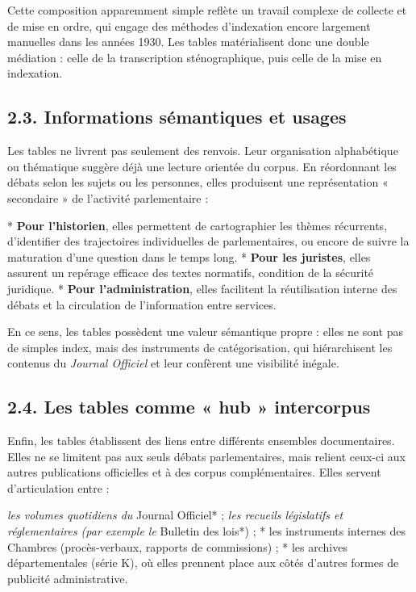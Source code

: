 Cette composition apparemment simple reflète un travail complexe de collecte et de mise en ordre, qui engage des méthodes d’indexation encore largement manuelles dans les années 1930. Les tables matérialisent donc une double médiation : celle de la transcription sténographique, puis celle de la mise en indexation.

\subsection{2.3. Informations sémantiques et usages}

Les tables ne livrent pas seulement des renvois. Leur organisation alphabétique ou thématique suggère déjà une lecture orientée du corpus. En réordonnant les débats selon les sujets ou les personnes, elles produisent une représentation « secondaire » de l’activité parlementaire :

* \textbf{Pour l’historien}, elles permettent de cartographier les thèmes récurrents, d’identifier des trajectoires individuelles de parlementaires, ou encore de suivre la maturation d’une question dans le temps long.
* \textbf{Pour les juristes}, elles assurent un repérage efficace des textes normatifs, condition de la sécurité juridique.
* \textbf{Pour l’administration}, elles facilitent la réutilisation interne des débats et la circulation de l’information entre services.

En ce sens, les tables possèdent une valeur sémantique propre : elles ne sont pas de simples index, mais des instruments de catégorisation, qui hiérarchisent les contenus du \emph{Journal Officiel} et leur confèrent une visibilité inégale.

\subsection{2.4. Les tables comme « hub » intercorpus}

Enfin, les tables établissent des liens entre différents ensembles documentaires. Elles ne se limitent pas aux seuls débats parlementaires, mais relient ceux-ci aux autres publications officielles et à des corpus complémentaires. Elles servent d’articulation entre :

\emph{ les volumes quotidiens du }Journal Officiel* ;
\emph{ les recueils législatifs et réglementaires (par exemple le }Bulletin des lois*) ;
* les instruments internes des Chambres (procès-verbaux, rapports de commissions) ;
* les archives départementales (série K), où elles prennent place aux côtés d’autres formes de publicité administrative.

